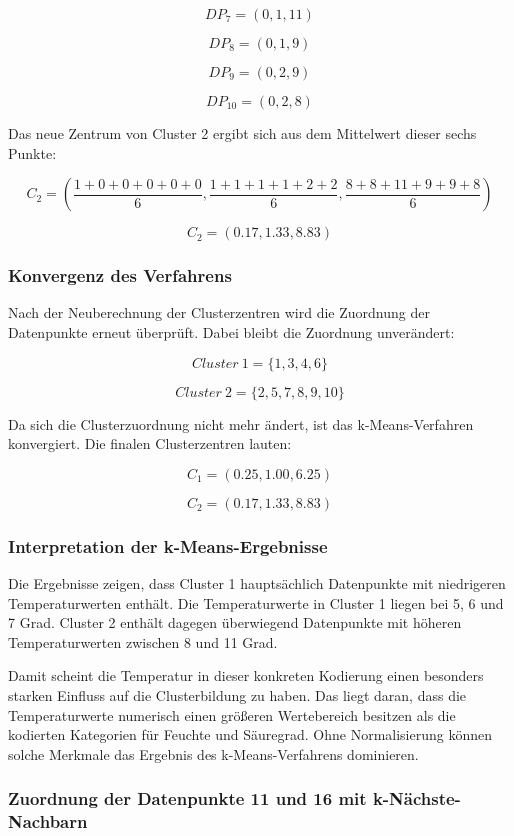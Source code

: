 \documentclass[12pt,a4paper]{article}
\begin{document}
\[
DP_7 = (0,1,11)
\]

\[
DP_8 = (0,1,9)
\]

\[
DP_9 = (0,2,9)
\]

\[
DP_{10} = (0,2,8)
\]

Das neue Zentrum von Cluster 2 ergibt sich aus dem Mittelwert dieser sechs Punkte:

\[
C_2 =
\left(
\frac{1+0+0+0+0+0}{6},
\frac{1+1+1+1+2+2}{6},
\frac{8+8+11+9+9+8}{6}
\right)
\]

\[
C_2 = (0.17, 1.33, 8.83)
\]

\subsubsection{Konvergenz des Verfahrens}

Nach der Neuberechnung der Clusterzentren wird die Zuordnung der Datenpunkte erneut überprüft. Dabei bleibt die Zuordnung unverändert:

\[
Cluster\ 1 = \{1,3,4,6\}
\]

\[
Cluster\ 2 = \{2,5,7,8,9,10\}
\]

Da sich die Clusterzuordnung nicht mehr ändert, ist das k-Means-Verfahren konvergiert. Die finalen Clusterzentren lauten:

\[
C_1 = (0.25, 1.00, 6.25)
\]

\[
C_2 = (0.17, 1.33, 8.83)
\]

\subsubsection{Interpretation der k-Means-Ergebnisse}

Die Ergebnisse zeigen, dass Cluster 1 hauptsächlich Datenpunkte mit niedrigeren Temperaturwerten enthält. Die Temperaturwerte in Cluster 1 liegen bei 5, 6 und 7 Grad. Cluster 2 enthält dagegen überwiegend Datenpunkte mit höheren Temperaturwerten zwischen 8 und 11 Grad.

Damit scheint die Temperatur in dieser konkreten Kodierung einen besonders starken Einfluss auf die Clusterbildung zu haben. Das liegt daran, dass die Temperaturwerte numerisch einen größeren Wertebereich besitzen als die kodierten Kategorien für Feuchte und Säuregrad. Ohne Normalisierung können solche Merkmale das Ergebnis des k-Means-Verfahrens dominieren.

\subsubsection{Zuordnung der Datenpunkte 11 und 16 mit k-Nächste-Nachbarn}
\end{document}
